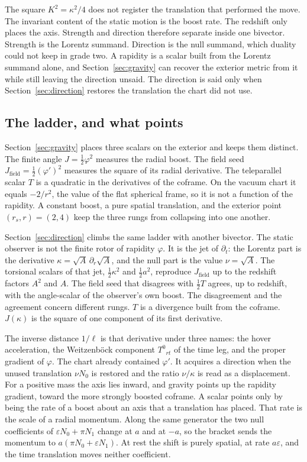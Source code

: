 \documentclass[a4paper]{article}
\begin{document}
The square \(K^{2}=\kappa^{2}/4\) does not register the translation that performed the move. The invariant content of the static motion is the boost rate. The redshift only places the axis. Strength and direction therefore separate inside one bivector. Strength is the Lorentz summand. Direction is the null summand, which duality could not keep in grade two. A rapidity is a scalar built from the Lorentz summand alone, and Section~\ref{sec:gravity} can recover the exterior metric from it while still leaving the direction unsaid. The direction is said only when Section~\ref{sec:direction} restores the translation the chart did not use.

\subsection{The ladder, and what points}

Section~\ref{sec:gravity} places three scalars on the exterior and keeps them distinct. The finite angle \(J=\tfrac12\varphi^{2}\) measures the radial boost. The field seed \(J_{\mathrm{field}}=\tfrac12(\varphi')^{2}\) measures the square of its radial derivative. The teleparallel scalar \(T\) is a quadratic in the derivatives of the coframe. On the vacuum chart it equals \(-2/r^{2}\), the value of the flat spherical frame, so it is not a function of the rapidity. A constant boost, a pure spatial translation, and the exterior point \((r_{s},r)=(2,4)\) keep the three rungs from collapsing into one another.

Section~\ref{sec:direction} climbs the same ladder with another bivector. The static observer is not the finite rotor of rapidity \(\varphi\). It is the jet of \(\partial_{t}\): the Lorentz part is the derivative \(\kappa=\sqrt{A}\,\partial_{r}\sqrt{A}\), and the null part is the value \(\nu=\sqrt{A}\). The torsional scalars of that jet, \(\tfrac12\kappa^{2}\) and \(\tfrac12 a^{2}\), reproduce \(J_{\mathrm{field}}\) up to the redshift factors \(A^{2}\) and \(A\). The field seed that disagrees with \(\tfrac12 T\) agrees, up to redshift, with the angle-scalar of the observer's own boost. The disagreement and the agreement concern different rungs. \(T\) is a divergence built from the coframe. \(J(\kappa)\) is the square of one component of its first derivative.

The inverse distance \(1/\ell\) is that derivative under three names: the hover acceleration, the Weitzenb\"{o}ck component \(T^{0}{}_{rt}\) of the time leg, and the proper gradient of \(\varphi\). The chart already contained \(\varphi'\). It acquires a direction when the unused translation \(\nu N_{0}\) is restored and the ratio \(\nu/\kappa\) is read as a displacement. For a positive mass the axis lies inward, and gravity points up the rapidity gradient, toward the more strongly boosted coframe. A scalar points only by being the rate of a boost about an axis that a translation has placed. That rate is the scale of a radial momentum. Along the same generator the two null coefficients of \(\varepsilon N_{0}+\pi N_{1}\) change at \(a\) and at \(-a\), so the bracket sends the momentum to \(a(\pi N_{0}+\varepsilon N_{1})\). At rest the shift is purely spatial, at rate \(a\varepsilon\), and the time translation moves neither coefficient.
\end{document}
